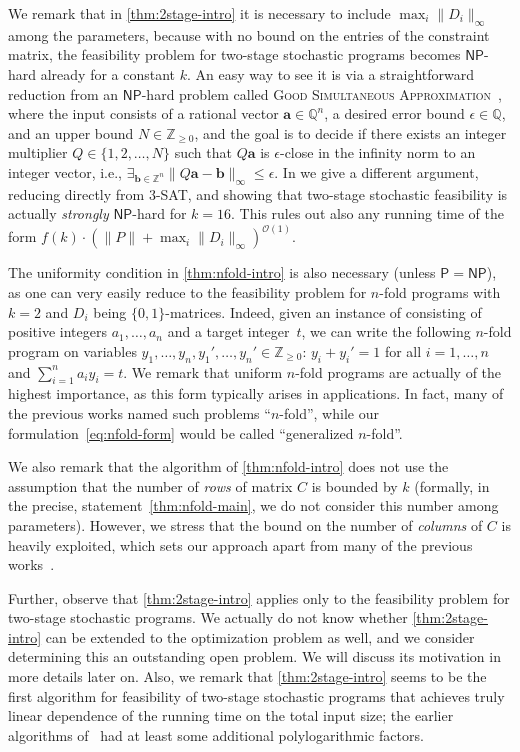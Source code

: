 \documentclass{article}
\renewcommand{\leq}{\leqslant}
\renewcommand{\geq}{\geqslant}
\newcommand{\Z}{\mathbb{Z}}
\newcommand{\Zn}{\Z_{\geq 0}}
\newcommand{\Q}{\mathbb{Q}}
\newcommand{\tup}[1]{{\mathbf{#1}}}
\newcommand{\av}{\tup a}
\newcommand{\bb}{\tup b}
\newcommand{\Oh}{{\mathcal{O}}}
\begin{document}
We remark that in \cref{thm:2stage-intro} it is necessary to include $\max_i \|D_i\|_\infty$ among the parameters, because with no bound on the entries of the constraint matrix, the feasibility problem for two-stage stochastic programs becomes $\mathsf{NP}$-hard already for a constant $k$. An easy way to see it is via a straightforward reduction from an $\mathsf{NP}$-hard problem called \textsc{Good Simultaneous Approximation}~\cite{Lagarias85}, where the input consists of a rational vector $\av \in \Q^n$, a desired error bound $\epsilon \in \Q$, and an upper bound $N \in \Zn$, and the goal is to decide if there exists an integer multiplier $Q \in \{1, 2, \ldots, N\}$ such that $Q\av$ is $\epsilon$-close in the infinity norm to an integer vector, i.e., $\exists_{\bb \in \Z^n} \|Q\av - \bb\|_\infty \leq \epsilon$. In  we give a different argument, reducing directly from 3-SAT, and showing that two-stage stochastic feasibility is actually \emph{strongly} $\mathsf{NP}$-hard for $k=16$. This rules out also any running time of the form $f(k) \cdot (\|P\|+\max_i \|D_i\|_\infty)^{\Oh(1)}$.

The uniformity condition in \cref{thm:nfold-intro} is also necessary (unless $\mathsf{P}=\mathsf{NP}$), as one can very easily reduce {} to the feasibility problem for $n$-fold programs with $k=2$ and $D_i$ being $\{0,1\}$-matrices. Indeed, given an instance of {} consisting of positive integers $a_1,\ldots,a_n$ and a target integer~$t$, we can write the following $n$-fold program on variables $y_1,\ldots,y_n,y_1',\ldots,y_n'\in \Zn$: $y_i+y_i'=1$ for all $i=1,\ldots,n$ and $\sum_{i=1}^n a_i y_i=t$. We remark that uniform $n$-fold programs are actually of the highest importance, as this form typically arises in applications. In fact, many of the previous works named such problems ``$n$-fold'', while our formulation~\cref{eq:nfold-form} would be called ``generalized $n$-fold''.

We also remark that the algorithm of \cref{thm:nfold-intro} does not use the assumption that the number of {\em{rows}} of matrix $C$ is bounded by $k$ (formally, in the precise, statement~\cref{thm:nfold-main}, we do not consider this number among parameters). However, we stress that the bound on the number of {\em{columns}} of $C$ is heavily exploited, which sets our approach apart from many of the previous works~\cite{CslovjecsekEHRW21,EisenbrandHK18,KouteckyLO18}.

Further, observe that \cref{thm:2stage-intro} applies only to the feasibility problem for two-stage stochastic programs. We actually do not know whether \cref{thm:2stage-intro} can be extended to the optimization problem as well, and we consider determining this an outstanding open problem. We will discuss its motivation in more details later on. Also, we remark that \cref{thm:2stage-intro} seems to be the first algorithm for feasibility of two-stage stochastic programs that achieves truly linear dependence of the running time on the total input size; the earlier algorithms of~\cite{CslovjecsekEPVW21,KouteckyLO18} had at least some additional polylogarithmic factors.
\end{document}
